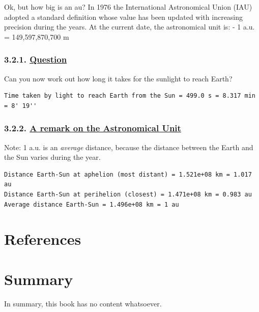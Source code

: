 \documentclass[
  letterpaper,
  DIV=11,
  numbers=noendperiod]{scrreprt}
\newlength{\cslhangindent}
\newlength{\cslentryspacingunit} %
\newenvironment{CSLReferences}[2] %
 {%
  \setlength{\parindent}{0pt}
  \ifodd #1
  \let\oldpar\par
  \def\par{\hangindent=\cslhangindent\oldpar}
  \fi
  \setlength{\parskip}{#2\cslentryspacingunit}
 }%
 {}
\begin{document}

Ok, but how big is an au? In 1976 the International Astronomical Union
(IAU) adopted a standard definition whose value has been updated with
increasing precision during the years. At the current date, the
astronomical unit is: - 1 a.u. = 149,597,870,700 m

\hypertarget{question-3}{%
\subsection*{\texorpdfstring{3.2.1.
\protect\hyperlink{toc0_}{Question}}{3.2.1. Question}}\label{question-3}}

Can you now work out how long it takes for the sunlight to reach Earth?

\begin{verbatim}
Time taken by light to reach Earth from the Sun = 499.0 s = 8.317 min = 8' 19'' 
\end{verbatim}

\hypertarget{a-remark-on-the-astronomical-unit-1}{%
\subsection*{\texorpdfstring{3.2.2. \protect\hyperlink{toc0_}{A remark
on the Astronomical
Unit}}{3.2.2. A remark on the Astronomical Unit}}\label{a-remark-on-the-astronomical-unit-1}}

Note: 1 a.u. is an \emph{average} distance, because the distance between
the Earth and the Sun varies during the year.

\begin{verbatim}
Distance Earth-Sun at aphelion (most distant) = 1.521e+08 km = 1.017 au
Distance Earth-Sun at perihelion (closest) = 1.471e+08 km = 0.983 au
Average distance Earth-Sun = 1.496e+08 km = 1 au
\end{verbatim}


\hypertarget{references-1}{%
\chapter*{References}\label{references-1}}


\hypertarget{refs}{}
\begin{CSLReferences}{0}{0}
\end{CSLReferences}


\hypertarget{summary-1}{%
\chapter*{Summary}\label{summary-1}}


In summary, this book has no content whatsoever.
\end{document}
